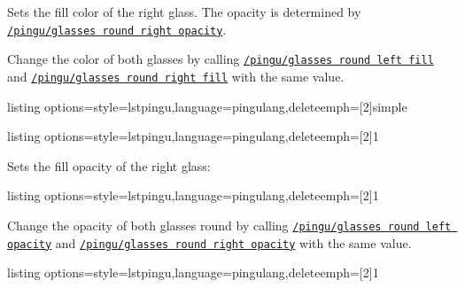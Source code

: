 \documentclass[parskip=half,english,numbers=noenddot,footnotes=nomultiple,oneside]{scrartcl}
\def\lpingu#1{\lstinline[style=lstpingu,language=pingulang]'#1'}
\newcommand*\keyref[2][/pingu/]{\hyperref[pk:#1#2]{\lpingu{#1#2}}}
\begin{document}
	Sets the fill color of the right glass. The opacity is determined by \keyref{glasses round right opacity}.
\begin{tcblisting}{}
\begin{tikzpicture}
	\pingu[glasses round,
		  glasses round right fill=green]
\end{tikzpicture}
\end{tcblisting}
\endsubkeyexplain

	Change the color of both glasses by calling \keyref{glasses round left fill} and \keyref{glasses round right fill} with the same value.
\begin{tcblisting}{listing options={style=lstpingu,language=pingulang,deleteemph={[2]{simple}}}}
\begin{tikzpicture}
	\pingu[glasses round, glasses round fill=green]
\end{tikzpicture}
\end{tcblisting}
\endsubkeyexplain

\begin{tcblisting}{listing options={style=lstpingu,language=pingulang,deleteemph={[2]{1}}}}
\begin{tikzpicture}
	\pingu[glasses round,
			 glasses round left fill=green,
			 glasses round left opacity=1]
\end{tikzpicture}
\end{tcblisting}
\endsubkeyexplain

	Sets the fill opacity of the right glass:
\begin{tcblisting}{listing options={style=lstpingu,language=pingulang,deleteemph={[2]{1}}}}
\begin{tikzpicture}
	\pingu[glasses round,
			 glasses round right fill=green,
			 glasses round right opacity=1]
\end{tikzpicture}
\end{tcblisting}
\endsubkeyexplain

	Change the opacity of both glasses round by calling \keyref{glasses round left opacity} and \keyref{glasses round right opacity} with the same value.
\begin{tcblisting}{listing options={style=lstpingu,language=pingulang,deleteemph={[2]{1}}}}
\begin{tikzpicture}
	\pingu[glasses round,
		glasses round fill=teal,
		glasses round opacity=1]
\end{tikzpicture}
\end{tcblisting}
\endsubkeyexplain
\end{document}
